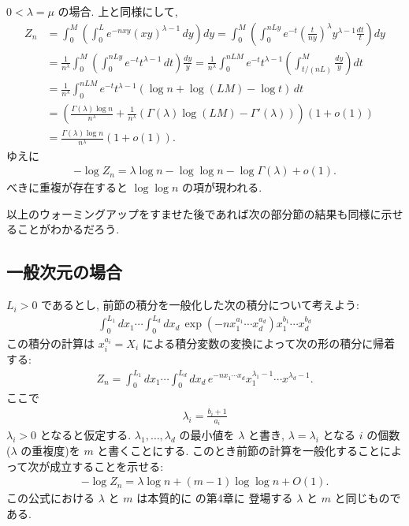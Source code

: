 \documentclass[12pt,twoside]{jarticle}
\theoremstyle{jplain}
\theoremstyle{jplain}
\theoremstyle{jplain}
\numberwithin{theorem}{section}
\numberwithin{equation}{section}
\numberwithin{figure}{section}
\numberwithin{table}{section}
\begin{document}
$0<\lambda=\mu$ の場合. 上と同様にして,
\begin{align*}
Z_n
&=\int_0^M \left(\int_0^L e^{-nxy} (xy)^{\lambda-1}\,dy\right)dy
=\int_0^M \left(\int_0^{nLy} e^{-t} \left(\frac{t}{ny}\right)^\lambda y^{\lambda-1}\frac{dt}{t}\right)dy
\\ &
=\frac{1}{n^\lambda}\int_0^M \left(\int_0^{nLy} e^{-t} t^{\lambda-1}\,dt\right)\frac{dy}{y}
=\frac{1}{n^\lambda}\int_0^{nLM} e^{-t} t^{\lambda-1} \left(\int_{t/(nL)}^{M}\frac{dy}{y}\right)dt
\\ &
=\frac{1}{n^\lambda}\int_0^{nLM} e^{-t} t^{\lambda-1}
\left(\log n + \log(LM) -\log t \right)\,dt
\\ &
=\left(
\frac{\Gamma(\lambda)\log n}{n^\lambda}
+\frac{1}{n^\lambda}
\left(\Gamma(\lambda)\log(LM)-\Gamma'(\lambda)\right)
\right)(1+o(1))
\\ &
=\frac{\Gamma(\lambda)\log n}{n^\lambda}(1+o(1)).
\end{align*}
ゆえに
\begin{align*}
-\log Z_n = \lambda\log n - \log\log n -\log\Gamma(\lambda)+o(1).
\end{align*}
べきに重複が存在すると $\log\log n$ の項が現われる.

以上のウォーミングアップをすませた後であれば次の部分節の結果も同様に示せることがわかるだろう.


\subsection{一般次元の場合}

$L_i>0$ であるとし, 
前節の積分を一般化した次の積分について考えよう:
\begin{align*}
\int_0^{L_1}dx_1\cdots\int_0^{L_d}dx_d\,
\exp\left(-n x_1^{a_1}\cdots x_d^{a_d}\right) x_1^{b_1}\cdots x_d^{b_d}
\end{align*}
この積分の計算は $x_i^{a_i}=X_i$ による積分変数の変換によって次の形の積分に帰着する:
\begin{align*}
Z_n = \int_0^{L_1}dx_1\cdots\int_0^{L_d}dx_d\, e^{-nx_1\cdots x_d} 
x_1^{\lambda_1-1}\cdots x^{\lambda_d-1}.
\end{align*}
ここで
\begin{align*}
\lambda_i = \frac{b_i+1}{a_i}
\end{align*}
$\lambda_i>0$ となると仮定する.
$\lambda_1,\ldots,\lambda_d$ の最小値を $\lambda$ と書き, 
$\lambda=\lambda_i$ となる $i$ の個数($\lambda$ の重複度)を $m$ と書くことにする.
このとき前節の計算を一般化することによって次が成立することを示せる:
\begin{align*}
-\log Z_n = \lambda \log n + (m-1)\log\log n + O(1).
\end{align*}
この公式における $\lambda$ と $m$ は本質的に \cite{watanabe-2012} の第4章に
登場する $\lambda$ と $m$ と同じものである.
\end{document}
